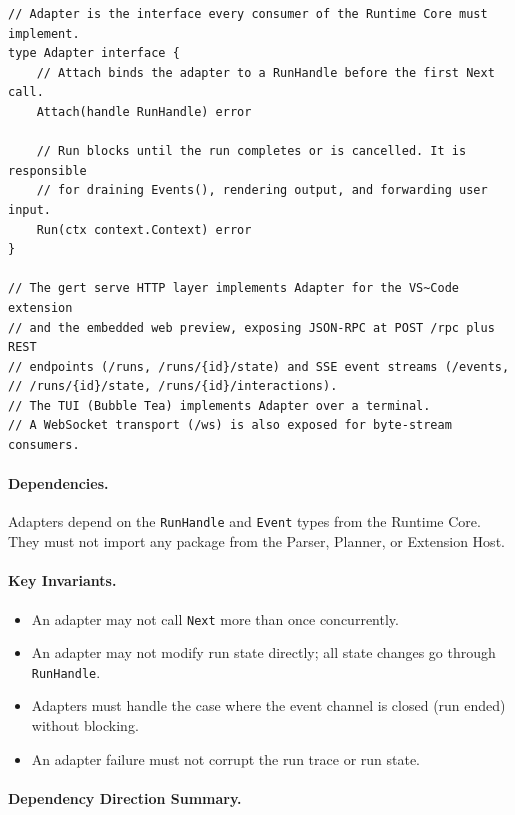\begin{verbatim}
// Adapter is the interface every consumer of the Runtime Core must implement.
type Adapter interface {
    // Attach binds the adapter to a RunHandle before the first Next call.
    Attach(handle RunHandle) error

    // Run blocks until the run completes or is cancelled. It is responsible
    // for draining Events(), rendering output, and forwarding user input.
    Run(ctx context.Context) error
}

// The gert serve HTTP layer implements Adapter for the VS~Code extension
// and the embedded web preview, exposing JSON-RPC at POST /rpc plus REST
// endpoints (/runs, /runs/{id}/state) and SSE event streams (/events,
// /runs/{id}/state, /runs/{id}/interactions).
// The TUI (Bubble Tea) implements Adapter over a terminal.
// A WebSocket transport (/ws) is also exposed for byte-stream consumers.
\end{verbatim}

\paragraph{Dependencies.}
Adapters depend on the \texttt{RunHandle} and \texttt{Event} types from the Runtime Core.
They must not import any package from the Parser, Planner, or Extension Host.

\paragraph{Key Invariants.}
\begin{itemize}
  \item An adapter may not call \texttt{Next} more than once concurrently.
  \item An adapter may not modify run state directly; all state changes go through \texttt{RunHandle}.
  \item Adapters must handle the case where the event channel is closed (run ended) without blocking.
  \item An adapter failure must not corrupt the run trace or run state.
\end{itemize}

\paragraph{Dependency Direction Summary.}

